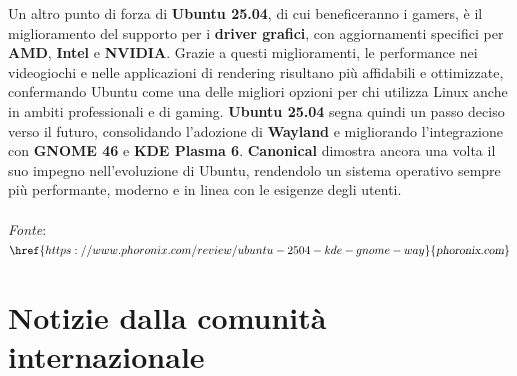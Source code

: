 \documentclass[a4paper,twoside]{article}
\begin{document}
Un altro punto di forza di \textbf{Ubuntu 25.04}, di cui beneficeranno i gamers, è il miglioramento del supporto per i \textbf{driver grafici}, con aggiornamenti specifici per \textbf{AMD}, \textbf{Intel} e \textbf{NVIDIA}. Grazie a questi miglioramenti, le performance nei videogiochi e nelle applicazioni di rendering risultano più affidabili e ottimizzate, confermando Ubuntu come una delle migliori opzioni per chi utilizza Linux anche in ambiti professionali e di gaming.
\textbf{Ubuntu 25.04} segna quindi un passo deciso verso il futuro, consolidando l'adozione di \textbf{Wayland} e  migliorando l'integrazione con \textbf{GNOME 46} e \textbf{KDE Plasma 6}. \textbf{Canonical} dimostra ancora una volta il suo impegno nell'evoluzione di Ubuntu, rendendolo un sistema operativo sempre più performante, moderno e in linea con le esigenze degli utenti.\\
\\
\textit{Fonte}:\\
$\href{https://www.phoronix.com/review/ubuntu-2504-kde-gnome-way}{\textsl{phoronix.com}}$

\section{Notizie dalla comunità internazionale}
\end{document}
